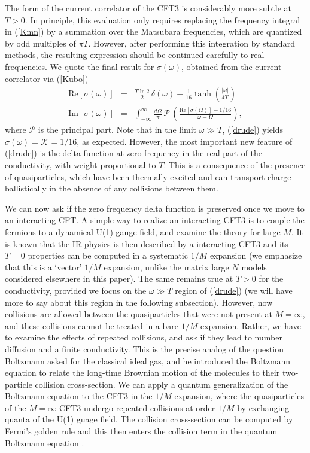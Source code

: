 \documentclass[10pt, oneside]{book}
\newcommand{\bea}{\begin{eqnarray}}
\newcommand{\eea}{\end{eqnarray}}
\begin{document}
\begin{doublespace}
The form of the current correlator of the CFT3 is considerably more subtle at $T>0$.  
In principle, this evaluation only requires replacing the frequency integral in (\ref{Kmn}) by a summation
over the Matsubara frequencies, which are quantized by odd multiples of $\pi T$. However, after performing this integration
by standard methods, the resulting expression should be continued carefully to real frequencies. 
We quote the final result for $\sigma(\omega)$, obtained from the current correlator via 
(\ref{Kubo})
\bea
\mbox{Re}[\sigma (\omega)]  &=& \frac{ T \ln 2}{2} \, \delta (\omega) + \frac{1}{16} \tanh \left( \frac{|\omega|}{4T} \right) \nonumber \\
\mbox{Im}[\sigma(\omega)] &=& \int_{-\infty}^{\infty} \frac{d \Omega}{\pi} \, \mathcal{P} \, 
\left( \frac{\mbox{Re}[\sigma (\Omega)] - 1/16}{\omega-\Omega} \right) ,
\label{drude}
\eea
where $\mathcal{P}$ is the principal part.
Note that in the limit $\omega \gg T$, (\ref{drude}) yields $\sigma (\omega) = \mathcal{K} = 1/16$, as expected.
However, the most important new feature of (\ref{drude}) is
the delta function at zero frequency in the real part of the conductivity, with weight proportional to $T$.
This is a consequence of the presence of quasiparticles, which have been thermally excited and can transport charge ballistically
in the absence of any collisions between them.

We can now ask if the zero frequency delta function is preserved once we move to an interacting CFT. A simple way to realize an interacting CFT3 
is to couple the fermions
to a dynamical U(1) gauge field, and examine the theory for large $M$. It is known that the IR physics is then described by a interacting CFT3 \cite{Appelquist:1988sr,Wen:1993zza,Chen:1993cd,Sachdev97,SVBSF,SBSVF,Strack13,Strack15} and its $T=0$ properties can be computed in a systematic $1/M$ expansion (we emphasize that this is a `vector' $1/M$ expansion, unlike the matrix large $N$ models considered elsewhere in this paper). The same remains true at $T>0$ for the conductivity, provided we focus on the $\omega \gg T$ region of (\ref{drude}) 
(we will have more to say about this region in the following subsection). However, now collisions are allowed between the quasiparticles that were not present at $M=\infty$, and these collisions cannot be treated in a bare $1/M$ expansion. Rather, we have to examine the effects of repeated collisions, and ask if they lead to number diffusion and a finite conductivity. This is the precise analog of the question Boltzmann asked for the classical ideal gas, and he introduced the Boltzmann equation to relate the long-time Brownian motion of the molecules to their two-particle collision cross-section. We can apply a quantum generalization of the Boltzmann equation to the
CFT3 in the $1/M$ expansion, where the quasiparticles of the $M=\infty$ CFT3 undergo repeated collisions at order $1/M$ by exchanging quanta of the U(1) guage field. The collision cross-section can be computed by Fermi's golden rule and this then enters the collision term in the quantum Boltzmann equation \cite{Damle97,Sachdev97}.


\end{doublespace}
\end{document}
